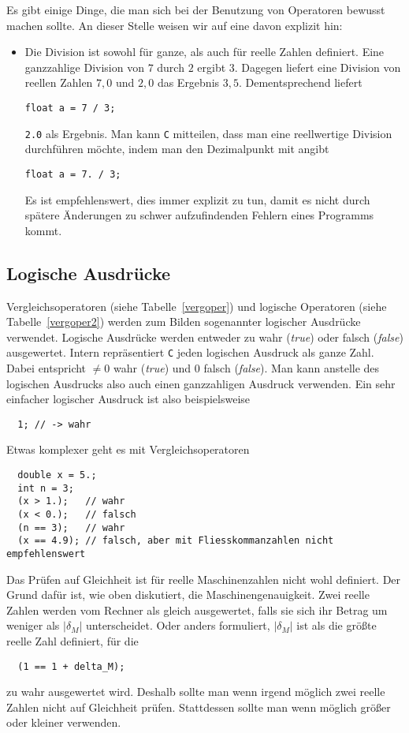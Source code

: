Es gibt einige Dinge, die man sich bei der Benutzung von Operatoren bewusst machen sollte.
An dieser Stelle weisen wir auf eine davon explizit hin:
\begin{itemize}
\item Die Division ist sowohl für ganze, als auch für reelle Zahlen definiert. 
  Eine ganzzahlige Division von $7$ durch $2$ ergibt $3$.
  Dagegen liefert eine Division von reellen Zahlen $7{,}0$ und $2{,}0$ das Ergebnis $3{,}5$.
  Dementsprechend liefert
\begin{lstlisting}
float a = 7 / 3;
\end{lstlisting}
  \verb|2.0| als Ergebnis. 
  Man kann \texttt{C} mitteilen, dass man eine reellwertige Division durchführen möchte, indem man den Dezimalpunkt mit angibt
\begin{lstlisting}
float a = 7. / 3;
\end{lstlisting}
Es ist empfehlenswert, dies immer explizit zu tun, damit es nicht durch spätere Änderungen zu schwer aufzufindenden Fehlern eines Programms kommt.
\end{itemize}

\subsection{Logische Ausdrücke}

Vergleichsoperatoren (siehe Tabelle~\ref{vergoper}) und logische Operatoren (siehe Tabelle~\ref{vergoper2}) werden zum Bilden sogenannter logischer Ausdrücke verwendet.
Logische Ausdrücke werden entweder zu wahr (\emph{true}) oder falsch (\emph{false}) ausgewertet.
Intern repräsentiert \texttt{C} jeden logischen Ausdruck als ganze Zahl.
Dabei entspricht $\neq 0$ wahr (\emph{true}) und $0$ falsch (\emph{false}).
Man kann anstelle des logischen Ausdrucks also auch einen ganzzahligen Ausdruck verwenden.
Ein sehr einfacher logischer Ausdruck ist also beispielsweise
\begin{lstlisting}
  1; // -> wahr
\end{lstlisting}
Etwas komplexer geht es mit Vergleichsoperatoren
\begin{lstlisting}
  double x = 5.;
  int n = 3;
  (x > 1.);   // wahr
  (x < 0.);   // falsch
  (n == 3);   // wahr
  (x == 4.9); // falsch, aber mit Fliesskommanzahlen nicht empfehlenswert
\end{lstlisting}
Das Prüfen auf Gleichheit ist für reelle Maschinenzahlen nicht wohl definiert.
Der Grund dafür ist, wie oben diskutiert, die Maschinengenauigkeit.
Zwei reelle Zahlen werden vom Rechner als gleich ausgewertet, falls sie sich ihr Betrag um weniger als $|\delta_M|$ unterscheidet. 
Oder anders formuliert, $|\delta_M|$ ist als die größte reelle Zahl definiert, für die 
\begin{lstlisting}
  (1 == 1 + delta_M);
\end{lstlisting}
zu wahr ausgewertet wird.
Deshalb sollte man wenn irgend möglich zwei reelle Zahlen nicht auf Gleichheit prüfen.
Stattdessen sollte man wenn möglich größer oder kleiner verwenden.

